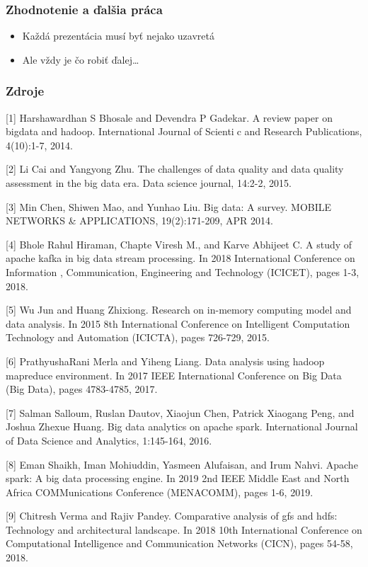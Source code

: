 \documentclass{beamer}
\begin{document}
\begin{frame}[fragile=singleslide]\frametitle{Zhodnotenie a ďalšia práca}
\begin{itemize}
\item Každá prezentácia musí byť nejako uzavretá
\item Ale vždy je čo robiť ďalej\ldots{}
\end{itemize}
\end{frame}

\begin{frame}[allowframebreaks]
\frametitle{Zdroje}
[1] Harshawardhan S Bhosale and Devendra P Gadekar.
A review paper on bigdata and hadoop.
International Journal of Scientic and Research Publications, 4(10):1-7, 2014.

[2] Li Cai and Yangyong Zhu.
The challenges of data quality and data quality assessment in the big data era.
Data science journal, 14:2-2, 2015.

[3] Min Chen, Shiwen Mao, and Yunhao Liu.
Big data: A survey.
MOBILE NETWORKS \& APPLICATIONS, 19(2):171-209, APR 2014.

[4] Bhole Rahul Hiraman, Chapte Viresh M., and Karve Abhijeet C.
A study of apache kafka in big data stream processing.
In 2018 International Conference on Information , Communication, Engineering and Technology (ICICET), pages 1-3, 2018.

[5] Wu Jun and Huang Zhixiong.
Research on in-memory computing model and data analysis.
In 2015 8th International Conference on Intelligent Computation Technology and Automation (ICICTA), pages 726-729, 2015.

[6] PrathyushaRani Merla and Yiheng Liang.
Data analysis using hadoop mapreduce environment.
In 2017 IEEE International Conference on Big Data (Big Data), pages 4783-4785, 2017.

[7] Salman Salloum, Ruslan Dautov, Xiaojun Chen, Patrick Xiaogang Peng, and Joshua Zhexue Huang.
Big data analytics on apache spark.
International Journal of Data Science and Analytics, 1:145-164, 2016.

[8] Eman Shaikh, Iman Mohiuddin, Yasmeen Alufaisan, and Irum Nahvi.
Apache spark: A big data processing engine.
In 2019 2nd IEEE Middle East and North Africa COMMunications Conference (MENACOMM), pages 1-6, 2019.

[9] Chitresh Verma and Rajiv Pandey.
Comparative analysis of gfs and hdfs: Technology and architectural landscape.
In 2018 10th International Conference on Computational Intelligence and Communication Networks (CICN), pages 54-58, 2018.
\end{frame}
\end{document}
